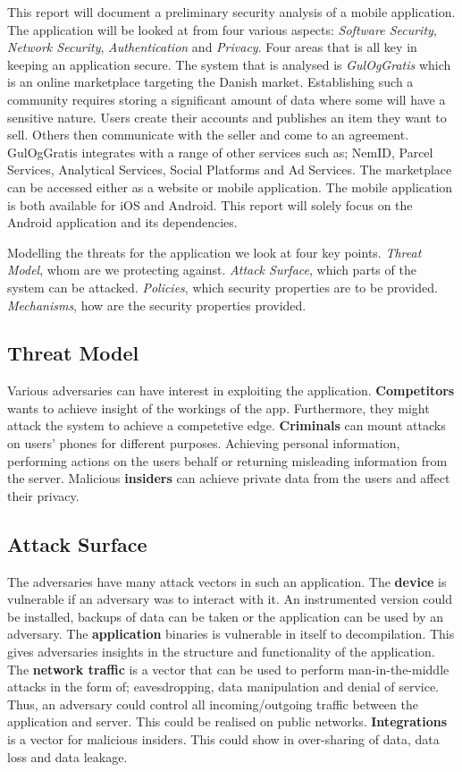 This report will document a preliminary security analysis of a mobile application. The application will be looked at from four various aspects: \textit{Software Security}, \textit{Network Security}, \textit{Authentication} and \textit{Privacy}. Four areas that is all key in keeping an application secure. The system that is analysed is \textit{GulOgGratis} which is an online marketplace targeting the Danish market. Establishing such a community requires storing a significant amount of data where some will have a sensitive nature. Users create their accounts and publishes an item they want to sell. Others then communicate with the seller and come to an agreement. GulOgGratis integrates with a range of other services such as; NemID, Parcel Services, Analytical Services, Social Platforms and Ad Services. The marketplace can be accessed either as a website or mobile application. The mobile application is both available for iOS and Android. This report will solely focus on the Android application and its dependencies.  

 Modelling the threats for the application we look at four key points. \textit{Threat Model},  whom are we protecting against. \textit{Attack Surface}, which parts of the system can be attacked. \textit{Policies}, which security properties are to be provided. \textit{Mechanisms}, how are the security properties provided.  

\subsection{Threat Model}
Various adversaries can have interest in exploiting the application. \textbf{Competitors} wants to achieve insight of the workings of the app. Furthermore, they might attack the system to achieve a competetive edge. \textbf{Criminals} can mount attacks on users' phones for different purposes. Achieving personal information, performing actions on the users behalf or returning misleading information from the server. Malicious \textbf{insiders} can achieve private data from the users and affect their privacy. 

\subsection{Attack Surface}
The adversaries have many attack vectors in such an application. The \textbf{device} is vulnerable if an adversary was to interact with it. An instrumented version could be installed, backups of data can be taken or the application can be used by an adversary. The \textbf{application} binaries is vulnerable in itself to decompilation. This gives adversaries insights in the structure and functionality of the application. The \textbf{network traffic} is a vector that can be used to perform man-in-the-middle attacks in the form of; eavesdropping, data manipulation and denial of service. Thus, an adversary could control all incoming/outgoing traffic between the application and server. This could be realised on public networks. \textbf{Integrations} is a vector for malicious insiders. This could show in over-sharing of data, data loss and data leakage.     


